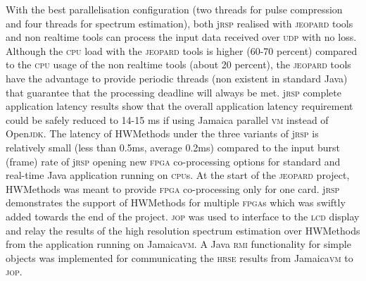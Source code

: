 \documentclass{sig-alternate}
\newcommand{\acronym}[1]{\textsc{#1}}
\begin{document}
With the best parallelisation configuration (two threads for pulse compression and four threads for spectrum estimation), both j\acronym{rsp} realised  
with \acronym{jeopard} tools and non realtime tools can process the input data received over \acronym{udp} with no loss. Although the \acronym{cpu}
load with the \acronym{jeopard} tools is higher (60-70 percent) compared to the \acronym{cpu} usage of
the non realtime tools (about 20 percent), the \acronym{jeopard} tools have the advantage to provide periodic 
threads (non existent in standard Java) that guarantee that the processing deadline
will always be met. j\acronym{rsp} complete application latency results show that the overall
application latency requirement could be safely reduced to 14-15 ms if using Jamaica parallel \acronym{vm} instead of Open\acronym{jdk}. The latency of HWMethods under the three variants of j\acronym{rsp} is relatively small (less than 0.5ms, average 0.2ms) compared to the input burst (frame) rate of j\acronym{rsp} opening new \acronym{fpga} co-processing options for standard and real-time Java application running on \acronym{cpu}s. At the start of the \acronym{jeopard} 
project, HWMethods was meant to provide \acronym{fpga} co-processing only for one card. 
j\acronym{rsp} demonstrates the support of HWMethods for multiple \acronym{fpga}s which was swiftly 
added towards the end of the project. \acronym{jop} was used to interface to the \acronym{lcd} display 
and relay the results of the high resolution spectrum estimation over HWMethods 
from the application running on Jamaica\acronym{vm}. A Java \acronym{rmi} functionality for simple 
objects was implemented for communicating the \acronym{hrse} 
results from Jamaica\acronym{vm} to \acronym {jop}\cite{jRmiBachelor}.
   
\end{document}
